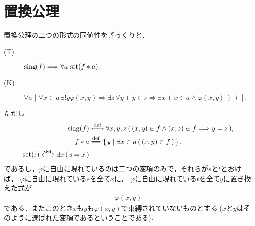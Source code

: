 \section{置換公理}
	置換公理の二つの形式の同値性をざっくりと．
	\begin{description}
		\item[(T)] $\operatorname*{sing} (f) \Longrightarrow \forall a\, \operatorname*{set} (f \ast a).$
		\item[(K)] $\forall a\, \left[\, \forall x \in a\, \exists!y \varphi(x,y)
				\Longrightarrow \exists z\, \forall y\,
				(\, y \in z \Longleftrightarrow \exists x\, (\, x \in a \wedge 
				\varphi(x,y)\, )\, )\, \right].$
	\end{description}
	
	ただし
	\begin{align}
		\sing{f} &\defarrow \forall x,y,z\, (\, (x,y) \in f \wedge (x,z) \in f
		\Longrightarrow y = z\, ), \\
		f \ast a &\defeq \Set{y}{\exists x \in a\, (\, (x,y) \in f\, )}, \\
		\set{s} \defarrow \exists x\, (\, s = x\, )
	\end{align}
	であるし，$\varphi$に自由に現れているのは二つの変項のみで，それらが$s$と$t$とおけば，
	$\varphi$に自由に現れている$s$を全て$x$に，
	$\varphi$に自由に現れている$t$を全て$y$に置き換えた式が
	\begin{align}
		\varphi(x,y)
	\end{align}
	である．またこのとき$x$も$y$も$\varphi(x,y)$で束縛されていないものとする
	($x$と$y$はそのように選ばれた変項であるということである)．
	
